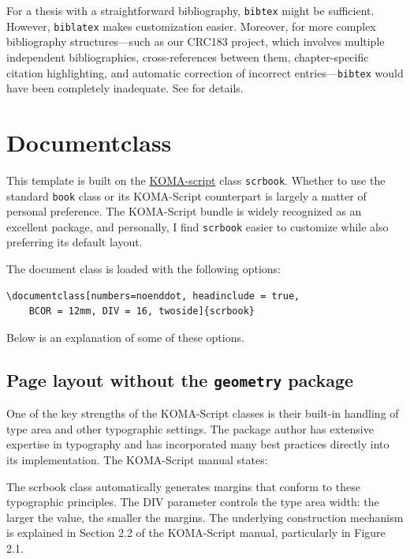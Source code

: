 For a thesis with a straightforward bibliography, \verb|bibtex| might be sufficient. However, \verb|biblatex| makes customization easier. Moreover, for more complex bibliography structures---such as our CRC183 project, which involves multiple independent bibliographies, cross-references between them, chapter-specific citation highlighting, and automatic correction of incorrect entries---\verb|bibtex| would have been completely inadequate.
See  for details.



\section{Documentclass}
This template is built on the \href{https://ctan.org/pkg/koma-script?lang=de}{KOMA-script} class \verb|scrbook|. Whether to use the standard \verb|book| class or its KOMA-Script counterpart is largely a matter of personal preference. The KOMA-Script bundle is widely recognized as an excellent package, and personally, I find \verb|scrbook| easier to customize while also preferring its default layout.

The document class is loaded with the following options:
\begin{lstlisting}
\documentclass[numbers=noenddot, headinclude = true,
	BCOR = 12mm, DIV = 16, twoside]{scrbook}
\end{lstlisting}
Below is an explanation of some of these options.

\subsection{Page layout without the \texttt{geometry} package}
One of the key strengths of the KOMA-Script classes is their built-in handling of type area and other typographic settings. The package author has extensive expertise in typography and has incorporated many best practices directly into its implementation. The KOMA-Script manual states:

The scrbook class automatically generates margins that conform to these typographic principles. The DIV parameter controls the type area width: the larger the value, the smaller the margins. The underlying construction mechanism is explained in Section 2.2 of the KOMA-Script manual, particularly in Figure 2.1.


